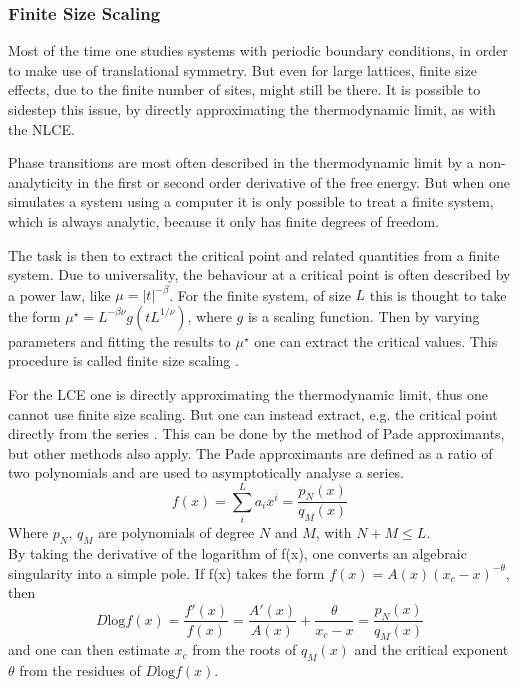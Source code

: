 \documentclass[a4paper,12pt]{article}
\begin{document}
\subsubsection{Finite Size Scaling}

Most of the time one studies systems with periodic boundary conditions, in
order to make use of translational symmetry. But even for large lattices,
finite size effects, due to the finite number of sites, might still be
there. It is possible to sidestep this issue, by directly approximating the
thermodynamic limit, as with the NLCE.

Phase transitions are most often described in the thermodynamic limit by a non-analyticity in the
first or second order derivative of the free energy. But when one
simulates a system using a computer it is only possible to treat a
finite system, which is always analytic, because it only has finite degrees of
freedom. 

The task is then to extract the critical point and related quantities
from a finite system. Due to universality, the behaviour at a critical
point is often described by a power law, like $\mu = |t|^{-\beta}$. For the
finite system, of size $L$ this is thought to take the form
$\mu^{\star} = L^{-\beta
\nu} g(tL^{1/\nu})$, where $g$ is a scaling function. Then
by varying parameters and fitting the results to $\mu^{\star}$ one
can extract the critical values. This procedure is called finite size
scaling \cite{cardy}.

For the LCE one is directly approximating the thermodynamic limit,
thus one cannot use finite size scaling. But one can instead extract, e.g.
the critical point directly from the series \cite{Series}. This can be done by the
method of Pade approximants, but other methods also apply.
The Pade approximants are defined as a ratio of two polynomials and
are used to asymptotically analyse a series.
\begin{equation}
\label{eq:34}
f(x) = \sum\limits_i^L a_i x^i = \frac{p_N(x)}{q_M(x)}
\end{equation}
Where $p_N$, $q_M$ are polynomials of degree $N$ and $M$, with $N + M
\leq L$.\\
By taking the derivative of the logarithm of f(x), one converts an
algebraic singularity into a simple pole. If f(x) takes the form $f(x)
= A(x)(x_c -x)^{-\theta}$, then
\begin{equation}
\label{eq:31}
D\text{log}f(x) = \frac{f'(x)}{f(x)} = \frac{A'(x)}{A(x)} +
\frac{\theta}{x_c - x} = \frac{p_N(x)}{q_M(x)}
\end{equation}
and one can then estimate $x_c$ from the roots of
$q_M(x)$ and the critical exponent $\theta$ from the residues of $D\text{log}f(x)$\cite{Series}.
\end{document}
